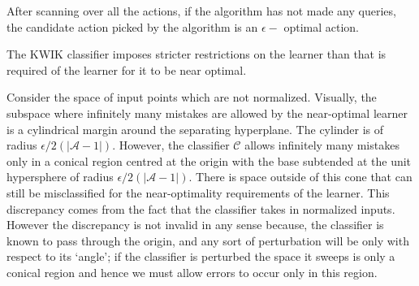 \begin{corr}
After scanning over all the actions, if the algorithm has not made any queries, the candidate action picked by the algorithm is an ${\epsilon}-$ optimal action.
\end{corr}

\begin{remark}
The KWIK classifier imposes stricter restrictions on the learner than that is required of the learner for it to be near optimal. 
\end{remark}
Consider the space of input points which are not normalized. Visually, the subspace where infinitely many mistakes are allowed by the near-optimal learner is a cylindrical margin around the separating hyperplane. The cylinder is of radius $\epsilon/2(|\mathcal{A}-1|)$. However, the classifier $\mathcal{C}$ allows infinitely many mistakes only in a conical region centred at the origin with the base subtended at the unit hypersphere of radius $\epsilon/2(|\mathcal{A}-1|)$. There is space outside of this cone that can still be misclassified for the near-optimality requirements of the learner. This discrepancy comes from the fact that the classifier takes in normalized inputs.
However the discrepancy is not invalid in any sense because,  the classifier is known to pass through the origin, and any sort of perturbation will be only with respect to its `angle'; if the classifier is perturbed the space it sweeps is only a conical region and hence we must allow errors to occur only in this region. \\